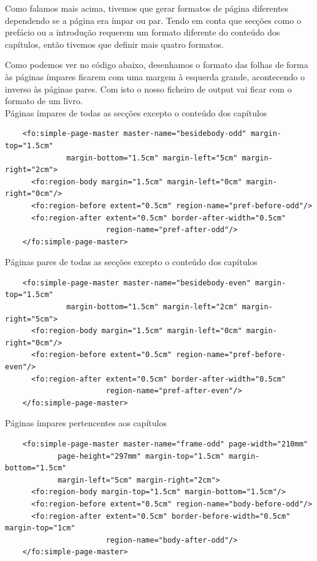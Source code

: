 \documentclass[a4paper]{article}
\begin{document}
\hspace{1cm}Como falamos mais acima, tivemos que gerar formatos de página diferentes dependendo se a página era ímpar ou par. Tendo em conta que secções como o prefácio ou a introdução requerem um formato diferente do conteúdo dos capítulos, então tivemos que definir mais quatro formatos.

\hspace{1cm}Como podemos ver no código abaixo, desenhamos o formato das folhas de forma às páginas ímpares ficarem com uma margem à esquerda grande, acontecendo o inverso às páginas pares. Com isto o nosso ficheiro de output vai ficar com o formato de um livro.\\

Páginas ímpares de todas as secções excepto o conteúdo dos capítulos
\begin{small}
\begin{lstlisting}
    <fo:simple-page-master master-name="besidebody-odd" margin-top="1.5cm" 
              margin-bottom="1.5cm" margin-left="5cm" margin-right="2cm">
      <fo:region-body margin="1.5cm" margin-left="0cm" margin-right="0cm"/>
      <fo:region-before extent="0.5cm" region-name="pref-before-odd"/>
      <fo:region-after extent="0.5cm" border-after-width="0.5cm" 
                       region-name="pref-after-odd"/>
    </fo:simple-page-master>
\end{lstlisting}
\end{small}

Páginas pares de todas as secções excepto o conteúdo dos capítulos
\begin{small}
\begin{lstlisting}
    <fo:simple-page-master master-name="besidebody-even" margin-top="1.5cm"
              margin-bottom="1.5cm" margin-left="2cm" margin-right="5cm">
      <fo:region-body margin="1.5cm" margin-left="0cm" margin-right="0cm"/>
      <fo:region-before extent="0.5cm" region-name="pref-before-even"/>
      <fo:region-after extent="0.5cm" border-after-width="0.5cm"
                       region-name="pref-after-even"/>
    </fo:simple-page-master>
\end{lstlisting}
\end{small}

Páginas ímpares pertencentes aos capítulos
\begin{small}
\begin{lstlisting}
    <fo:simple-page-master master-name="frame-odd" page-width="210mm"
            page-height="297mm" margin-top="1.5cm" margin-bottom="1.5cm"
            margin-left="5cm" margin-right="2cm">
      <fo:region-body margin-top="1.5cm" margin-bottom="1.5cm"/>
      <fo:region-before extent="0.5cm" region-name="body-before-odd"/>
      <fo:region-after extent="0.5cm" border-before-width="0.5cm" margin-top="1cm"
                       region-name="body-after-odd"/>
    </fo:simple-page-master>
\end{lstlisting}
\end{small}
                
\end{document}
